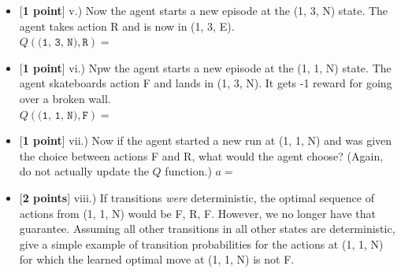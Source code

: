 \begin{itemize}
\begin{tcolorbox}[fit,height=1cm, width=4cm, blank, borderline={1pt}{-2pt}]
    \end{tcolorbox}
    \item [] {[\textbf{1 point}]} v.) Now the agent starts a new episode at the (1, 3, N) state. The agent takes action R and is now in (1, 3, E). \\ $Q(\texttt{(1, 3, N)}, \texttt{R})=$ \begin{tcolorbox}[fit,height=1cm, width=4cm, blank, borderline={1pt}{-2pt}]
    \end{tcolorbox}
    \item [] {[\textbf{1 point}]} vi.) Npw the agent starts a new episode at the (1, 1, N) state. The agent skateboards action F and lands in (1, 3, N). It gets -1 reward for going over a broken wall.\\ $Q(\texttt{(1, 1, N)}, \texttt{F})=$ \begin{tcolorbox}[fit,height=1cm, width=4cm, blank, borderline={1pt}{-2pt}]
    \end{tcolorbox}
    \item [] {[\textbf{1 point}]} vii.) Now if the agent started a new run at (1, 1, N) and was given the choice between actions F and R, what would the agent choose? (Again, do not actually update the $Q$ function.) $a=$ \begin{tcolorbox}[fit,height=1cm, width=4cm, blank, borderline={1pt}{-2pt}]
    \end{tcolorbox}
    \item [] {[\textbf{2 points}]} viii.) If transitions \textit{were} deterministic, the optimal sequence of actions from (1, 1, N) would be F, R, F. However, we no longer have that guarantee. Assuming all other transitions in all other states are deterministic, give a simple example of transition probabilities for the actions at (1, 1, N) for which the learned optimal move at (1, 1, N) is not F.

    \begin{tcolorbox}[fit,height=4cm, width=17cm, blank, borderline={1pt}{-2pt},nobeforeafter]

    \end{tcolorbox}
    
    
\end{itemize}
